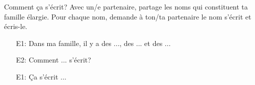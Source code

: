 \begin{frame}{Comment ça s'écrit? }
  Avec un/e partenaire, partage les noms qui constituent ta famille élargie.
  Pour chaque nom, demande à ton/ta partenaire le nom s'écrit et écris-le. \\
  \begin{itemize}
    \item[E1:] Dans ma famille, il y a des ..., des ... et des ...
    \item[E2:] Comment ... s'écrit?
    \item[E1:] Ça s'écrit ...
  \end{itemize}
\end{frame}